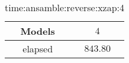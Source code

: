 \begin{table}[!ht]
	\centering
	\begin{tabular}{|c|c|}
		\hline
		Models & $4$ \\ \hline
		elapsed & $843.80$ \\ \hline
	\end{tabular}
	\caption{time:ansamble:reverse:xzap:4}
	\label{tab:time:ansamble:reverse:xzap:4}
\end{table}
